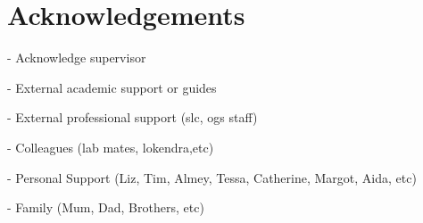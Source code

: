 \chapter*{Acknowledgements}

- Acknowledge supervisor

- External academic support or guides

- External professional support (slc, ogs staff)

- Colleagues (lab mates, lokendra,etc)

- Personal Support (Liz, Tim, Almey, Tessa, Catherine, Margot, Aida, etc)

- Family (Mum, Dad, Brothers, etc)
